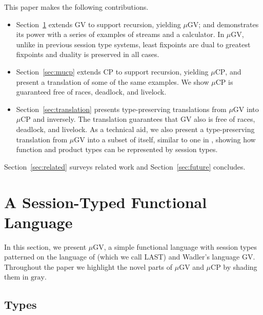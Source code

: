 \documentclass[orivec,envcountsame]{llncs}
\newcommand{\mucp}{$\mu\mathrm{CP}$\xspace}
\newcommand{\mugv}{$\mu\mathrm{GV}$\xspace}
\newcommand\shade[1]{\setlength{\fboxsep}{0pt}\colorbox{shade}{\ensuremath{#1}}}
\begin{document}
This paper makes the following contributions.
\begin{itemize}
\item Section~\ref{sec:mugv} extends GV to support recursion, yielding \mugv; and demonstrates its
  power with a series of examples of streams and a calculator.
  In \mugv, unlike in previous session type systems, least fixpoints are dual to greatest fixpoints
  and duality is preserved in all cases.
\item Section~\ref{sec:mucp} extends CP to support recursion, yielding \mucp, and present a
  translation of some of the same examples. We show \mucp is guaranteed free of races, deadlock, and
  livelock.
\item Section~\ref{sec:translation} presents type-preserving translations from \mugv into \mucp and
  inversely. The translation guarantees that GV also is free of races, deadlock, and livelock.
  As a technical aid, we also present a type-preserving translation from \mugv into a
  subset of itself, similar to one in \citet{LindleyM14}, showing how function and product
  types can be represented by session types.
\end{itemize}
Section~\ref{sec:related} surveys related work and Section~\ref{sec:future} concludes.

\section{A Session-Typed Functional Language}
\label{sec:mugv}

In this section, we present \mugv, a simple functional language with session types patterned on the
language of \citet{GayVasconcelos10} (which we call LAST) and Wadler's language GV.
%
Throughout the paper we highlight the novel parts of \mugv and \mucp by shading them in
\shade{\mathrm{gray}}.

\subsection{Types}
\label{sec:mugv-types}
\end{document}
